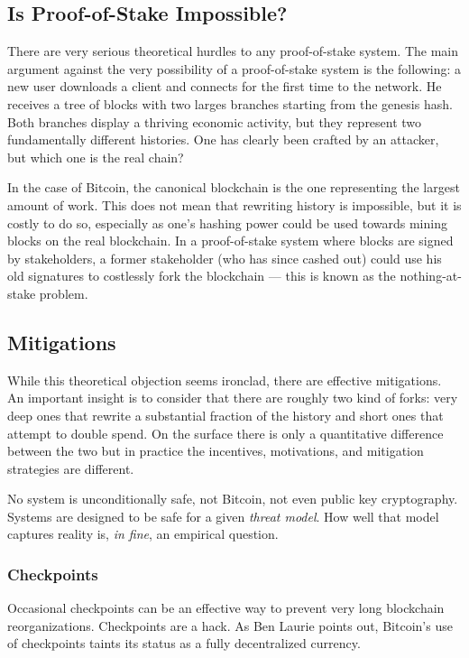 \documentclass[letterpaper]{article}
\begin{document}
\subsection{Is Proof-of-Stake Impossible?}

There are very serious theoretical hurdles to any proof-of-stake system.
The main argument against the very possibility of a proof-of-stake system
is the following:
a new user downloads a client and connects for the first time to the network.
He receives a tree of blocks with two larges branches
starting from the genesis hash.
Both branches display a thriving economic activity,
but they represent two fundamentally different histories.
One has clearly been crafted by an attacker, but which one is the real chain?

In the case of Bitcoin, the canonical blockchain is the one representing the
largest amount of work. This does not mean that rewriting history is impossible,
but it is costly to do so, especially as one's hashing power could be used
towards mining blocks on the real blockchain.
In a proof-of-stake system where blocks are signed by stakeholders,
a former stakeholder (who has since cashed out) could use his old signatures
to costlessly fork the blockchain
--- this is known as the nothing-at-stake problem.


\subsection{Mitigations}

While this theoretical objection seems ironclad, there are effective mitigations.
An important insight is to consider that there are roughly two kind of forks:
very deep ones that rewrite a substantial fraction of the history
and short ones that attempt to double spend.
On the surface there is only a quantitative difference between the two
but in practice the incentives, motivations,
and mitigation strategies are different.

No system is unconditionally safe, not Bitcoin, not even public key
cryptography.  Systems are designed to be safe for a given \emph{threat model}. How well
that model captures reality is, \emph{in fine}, an empirical question.

\subsubsection{Checkpoints}
Occasional checkpoints can be an effective way to prevent very long blockchain reorganizations.
Checkpoints are a hack. As Ben Laurie points out, Bitcoin's use of checkpoints
taints its status as a fully decentralized currency\cite{distrib_impossible}.
\end{document}
